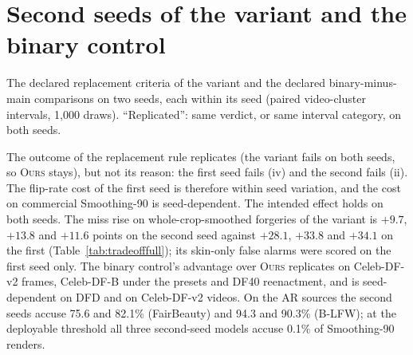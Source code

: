 \documentclass[10pt]{article}
\newcommand{\ours}{\textsc{Ours}}
\begin{document}
\section{Second seeds of the variant and the binary control}
\label{sec:seeds}
\begin{table}[H]
\centering
\caption{The declared replacement criteria of the variant and the declared binary-minus-main comparisons on two seeds, each within
its seed (paired video-cluster intervals, 1,000 draws). ``Replicated'': same verdict, or same interval category, on both seeds.}
\label{tab:seeds}
\scriptsize
\begin{adjustbox}{max width=\linewidth}\end{adjustbox}
\end{table}
The outcome of the replacement rule replicates (the variant fails on both seeds, so \ours{} stays), but not its reason: the first
seed fails (iv) and the second fails (ii). The flip-rate cost of the first seed is therefore within seed variation, and the cost on
commercial Smoothing-90 is seed-dependent. The intended effect holds on both seeds. The miss rise on whole-crop-smoothed forgeries
of the variant is $+9.7$, $+13.8$ and $+11.6$ points on the second seed against $+28.1$, $+33.8$ and $+34.1$ on the first
(Table~\ref{tab:tradeofffull}); its skin-only false alarms were scored on the first seed only. The binary control's advantage over
\ours{} replicates on Celeb-DF-v2 frames, Celeb-DF-B under the presets and DF40 reenactment, and is seed-dependent on DFD and on
Celeb-DF-v2 videos. On the AR sources the second seeds accuse 75.6 and 82.1\% (FairBeauty) and 94.3 and 90.3\% (B-LFW); at the
deployable threshold all three second-seed models accuse 0.1\% of Smoothing-90 renders.
\end{document}
